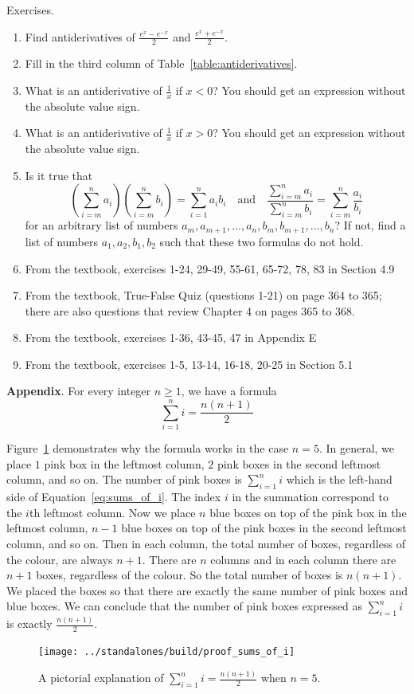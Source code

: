 \documentclass[../main]{subfiles}
\begin{document}
%
%
Exercises.
\begin{enumerate}
\item Find antiderivatives of \(\frac{e^{x} - e^{-x}}{2}\) and \(\frac{e^{x} + e^{-x}}{2}\).
\item Fill in the third column of Table~\ref{table:antiderivatives}.
\item What is an antiderivative of \(\frac{1}{x}\) if \(x < 0\)? You should get an expression without the absolute value sign.
\item What is an antiderivative of \(\frac{1}{x}\) if \(x > 0\)? You should get an expression without the absolute value sign.
\item Is it true that
  \[
    \left( \sum_{i=m}^{n} a_{i} \right) \left( \sum_{i=m}^{n} b_{i} \right) = \sum_{i=1}^{n} a_{i} b_{i}
    \quad\text{and}\quad
    \dfrac{\sum_{i=m}^{n} a_{i}}{\sum_{i=m}^{n} b_{i}} = \sum_{i=m}^{n} \frac{a_{i}}{b_{i}}
  \]
  for an arbitrary list of numbers \(a_{m}, a_{m+1}, \dots, a_{n}, b_{m}, b_{m+1}, \dots, b_{n}\)? If not, find a list of numbers \(a_{1}, a_{2}, b_{1}, b_{2}\) such that these two formulas do not hold.
  \item From the textbook, exercises  1-24, 29-49, 55-61, 65-72, 78, 83 in Section 4.9%
  \item From the textbook, True-False Quiz (questions 1-21) on page 364 to 365; there are also questions that review
Chapter 4 on pages 365 to 368.
    \item From the textbook, exercises 1-36, 43-45, 47 in Appendix E%
    \item  From the textbook, exercises   1-5, 13-14, 16-18, 20-25  in Section 5.1%
\end{enumerate}



\noindent\textbf{Appendix}. For every integer \(n \ge 1\), we have a formula
\begin{equation} \label{eq:sums_of_i}
  \sum_{i=1}^{n} i = \frac{n(n+1)}{2}
\end{equation}
      
Figure~\ref{fig:sums_of_i} demonstrates why the formula works in the case \(n=5\). In general, we place \(1\) pink box in the leftmost column, \(2\) pink boxes in the second leftmost column, and so on. The number of pink boxes is \(\sum_{i=1}^{n} i\) which is the left-hand side of Equation~\eqref{eq:sums_of_i}. The index \(i\) in the summation correspond to the \(i\)th leftmost column. Now we place \(n\) blue boxes on top of the pink box in the leftmost column, \(n-1\) blue boxes on top of the pink boxes in the second leftmost column, and so on. Then in each column, the total number of boxes, regardless of the colour, are always \(n+1\). There are \(n\) columns and in each column there are \(n+1\) boxes, regardless of the colour. So the total number of boxes is \(n(n+1)\). We placed the boxes so that there are exactly the same number of pink boxes and blue boxes. We can conclude that the number of pink boxes expressed as \(\sum_{i=1}^{n} i\) is exactly \(\frac{n(n+1)}{2}\).

\begin{figure}[h]
  \centering
  \texttt{[image: ../standalones/build/proof\_sums\_of\_i]}
  \caption{A pictorial explanation of \(\sum_{i=1}^{n} i =  \frac{n(n+1)}{2}\) when \(n = 5\).}
  \label{fig:sums_of_i}
\end{figure}
\end{document}

